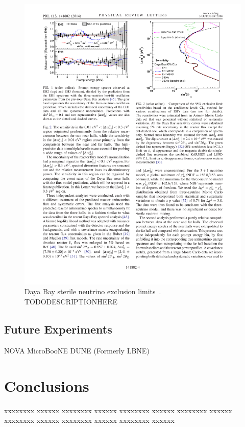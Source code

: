 \documentclass[aps,prd,twocolumn,nofootinbib]{revtex4-1}
\begin{document}
\begin{figure}[H]
 \centering
 \includegraphics[width=1\columnwidth]{../figures/daya1.pdf}
 \caption{Daya Bay sterile neutrino exclusion limits~\cite{DayaBay}. TODODESCRIPTIONHERE}
 \label{fig:DayaBay}
\end{figure}


\subsection{Future Experiments}
NOVA
MicroBooNE
DUNE (Formerly LBNE)


\section{Conclusions}
xxxxxxxx xxxxxx xxxxxxxx xxxxxx xxxxxxxx xxxxxx xxxxxxxx xxxxxx xxxxxxxx xxxxxx xxxxxxxx xxxxxx xxxxxxxx xxxxxx
\end{document}
